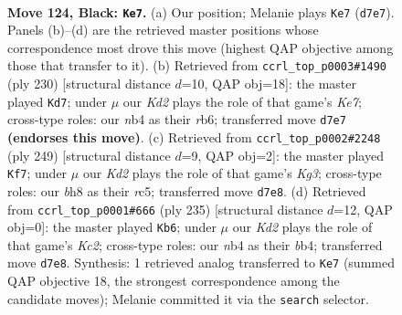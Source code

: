 \documentclass[11pt]{article}
\begin{document}
\begin{figure}[p]\centering
\begin{subfigure}{0.46\textwidth}\centering
\resizebox{\linewidth}{!}{%
\newchessgame
\chessboard[
  setfen={7B/3k4/8/2q5/1N6/1K6/8/8 b - - 17 124},
  showmover=false,
  pgfstyle=straightmove, color=movearrow, markmove={d7-e7}
]}
\caption{}
\end{subfigure}\hfill
\begin{subfigure}{0.46\textwidth}\centering
\resizebox{\linewidth}{!}{%
\newchessgame
\chessboard[
  setfen={8/4K3/1r6/k7/3Q4/8/8/8 w - - 7 116},
  showmover=false,
  pgfstyle=straightmove, color=movearrow, markmove={e7-d7}
]}
\caption{}
\end{subfigure}
\\[4pt]
\begin{subfigure}{0.46\textwidth}\centering
\resizebox{\linewidth}{!}{%
\newchessgame
\chessboard[
  setfen={4N2q/1K6/6k1/2R5/8/3B4/8/8 b - - 48 125},
  showmover=false,
  pgfstyle=straightmove, color=movearrow, markmove={g6-f7}
]}
\caption{}
\end{subfigure}\hfill
\begin{subfigure}{0.46\textwidth}\centering
\resizebox{\linewidth}{!}{%
\newchessgame
\chessboard[
  setfen={8/2k5/8/3K4/1B6/8/4B3/8 b - - 14 118},
  showmover=false,
  pgfstyle=straightmove, color=movearrow, markmove={c7-b6}
]}
\caption{}
\end{subfigure}
\caption{\textbf{Move 124, Black: \texttt{Ke7}.} (a) Our position; Melanie plays \texttt{Ke7} (\texttt{d7e7}). Panels (b)--(d) are the retrieved master positions whose correspondence most drove this move (highest QAP objective among those that transfer to it). (b) Retrieved from \texttt{ccrl\_top\_p0003\#1490} (ply 230) [structural distance $d$=10, QAP obj=18]: the master played \texttt{Kd7}; under $\mu$ our \emph{Kd2} plays the role of that game's \emph{Ke7}; cross-type roles: our \emph{n}b4 as their \emph{r}b6; transferred move \texttt{d7e7} \textbf{(endorses this move)}. (c) Retrieved from \texttt{ccrl\_top\_p0002\#2248} (ply 249) [structural distance $d$=9, QAP obj=2]: the master played \texttt{Kf7}; under $\mu$ our \emph{Kd2} plays the role of that game's \emph{Kg3}; cross-type roles: our \emph{b}h8 as their \emph{r}c5; transferred move \texttt{d7e8}. (d) Retrieved from \texttt{ccrl\_top\_p0001\#666} (ply 235) [structural distance $d$=12, QAP obj=0]: the master played \texttt{Kb6}; under $\mu$ our \emph{Kd2} plays the role of that game's \emph{Kc2}; cross-type roles: our \emph{n}b4 as their \emph{b}b4; transferred move \texttt{d7e8}. Synthesis: 1 retrieved analog transferred to \texttt{Ke7} (summed QAP objective 18, the strongest correspondence among the candidate moves); Melanie committed it via the \texttt{search} selector.}
\label{fig:thought-m247}
\end{figure}
\end{document}
